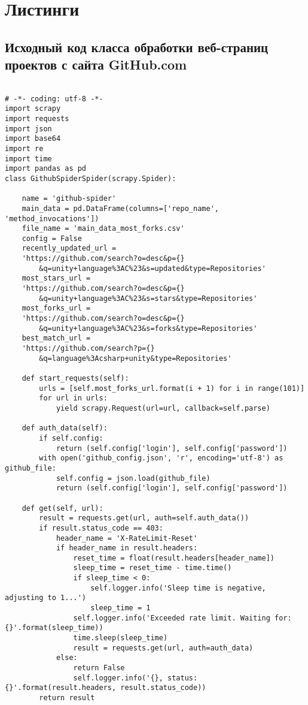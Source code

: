 \chapter{Листинги}
\section{Исходный код класса обработки веб-страниц проектов с сайта GitHub.com}
\begin{lstlisting}[caption={Исходный код класса обработки веб-страниц проектов с сайта GitHub.com},label=spider]

# -*- coding: utf-8 -*-
import scrapy
import requests
import json
import base64
import re
import time
import pandas as pd
class GithubSpiderSpider(scrapy.Spider):

	name = 'github-spider'
	main_data = pd.DataFrame(columns=['repo_name', 'method_invocations'])
	file_name = 'main_data_most_forks.csv'
	config = False
	recently_updated_url = 
	'https://github.com/search?o=desc&p={}
		&q=unity+language%3AC%23&s=updated&type=Repositories'
	most_stars_url = 
	'https://github.com/search?o=desc&p={}
		&q=unity+language%3AC%23&s=stars&type=Repositories'
	most_forks_url = 
	'https://github.com/search?o=desc&p={}
		&q=unity+language%3AC%23&s=forks&type=Repositories'
	best_match_url = 
	'https://github.com/search?p={}
		&q=language%3Acsharp+unity&type=Repositories'

	def start_requests(self):
		urls = [self.most_forks_url.format(i + 1) for i in range(101)]
		for url in urls:
			yield scrapy.Request(url=url, callback=self.parse)
	
	def auth_data(self):
		if self.config:
			return (self.config['login'], self.config['password'])
		with open('github_config.json', 'r', encoding='utf-8') as github_file:
			self.config = json.load(github_file)
			return (self.config['login'], self.config['password'])
		
	def get(self, url):
		result = requests.get(url, auth=self.auth_data())
		if result.status_code == 403:
			header_name = 'X-RateLimit-Reset'
			if header_name in result.headers:
				reset_time = float(result.headers[header_name])
				sleep_time = reset_time - time.time()
				if sleep_time < 0:
					self.logger.info('Sleep time is negative, adjusting to 1...')
					sleep_time = 1
				self.logger.info('Exceeded rate limit. Waiting for: {}'.format(sleep_time))
				time.sleep(sleep_time)
				result = requests.get(url, auth=auth_data)
			else:
				return False
				self.logger.info('{}, status: {}'.format(result.headers, result.status_code))
		return result
	

\end{lstlisting}
